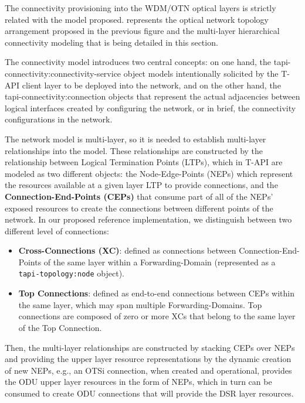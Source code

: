 \documentclass[a4paper,fleqn]{cas-dc}
\begin{document}
The connectivity provisioning into the WDM/OTN optical layers is strictly related with the model proposed.  represents the optical network topology arrangement proposed in the previous figure and the multi-layer hierarchical connectivity modeling that is being detailed in this section.

The connectivity model introduces two central concepts: on one hand, the tapi-connectivity:connectivity-service object models intentionally solicited by the T-API client layer to be deployed into the network, and on the other hand, the tapi-connectivity:connection objects that represent the actual adjacencies between logical interfaces created by configuring the network, or in brief, the connectivity configurations in the network. 

The network model is multi-layer, so it is needed to establish multi-layer relationships into the model. These relationships are constructed by the relationship between Logical Termination Points (LTPs), which in T-API are modeled as two different objects: the Node-Edge-Points (NEPs) which represent the resources available at a given layer LTP to provide connections, and the \textbf{Connection-End-Points (CEPs)} that consume part of all of the NEPs’ exposed resources to create the connections between different points of the network. In our proposed reference implementation, we distinguish between two different level of connections:

\begin{itemize}
    \item \textbf{Cross-Connections (XC)}: defined as connections between Connection-End-Points of the same layer within a Forwarding-Domain (represented as a\\ \texttt{tapi-topology:node} object). 
    \item \textbf{Top Connections}: defined as end-to-end connections between CEPs within the same layer, which may span multiple Forwarding-Domains. Top connections are composed of zero or more XCs that belong to the same layer of the Top Connection.
\end{itemize}

Then, the multi-layer relationships are constructed by stacking CEPs over NEPs and providing the upper layer resource representations by the dynamic creation of new NEPs, e.g., an OTSi connection, when created and operational, provides the ODU upper layer resources in the form of NEPs, which in turn can be consumed to create ODU connections that will provide the DSR layer resources.
\end{document}
